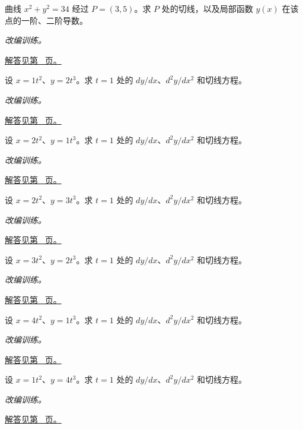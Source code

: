 \documentclass[UTF8,12pt,a4paper,fontset=fandol]{ctexart}
\begin{document}
\begin{example}[圆的隐函数导数]\label{ex:c9q6}
曲线 $x^2+y^2=34$ 经过 $P=(3,5)$。求 $P$ 处的切线，以及局部函数 $y(x)$ 在该点的一阶、二阶导数。
\par\textit{改编训练。}\par\hyperref[ans:c9q6]{解答见第~\pageref{ans:c9q6} 页。}
\end{example}
\begin{example}[幂参数曲线]\label{ex:c9q7}
设 $x=1t^2$、$y=2t^3$。求 $t=1$ 处的 $dy/dx$、$d^2y/dx^2$ 和切线方程。
\par\textit{改编训练。}\par\hyperref[ans:c9q7]{解答见第~\pageref{ans:c9q7} 页。}
\end{example}
\begin{example}[幂参数曲线]\label{ex:c9q8}
设 $x=2t^2$、$y=1t^3$。求 $t=1$ 处的 $dy/dx$、$d^2y/dx^2$ 和切线方程。
\par\textit{改编训练。}\par\hyperref[ans:c9q8]{解答见第~\pageref{ans:c9q8} 页。}
\end{example}
\begin{example}[幂参数曲线]\label{ex:c9q9}
设 $x=2t^2$、$y=3t^3$。求 $t=1$ 处的 $dy/dx$、$d^2y/dx^2$ 和切线方程。
\par\textit{改编训练。}\par\hyperref[ans:c9q9]{解答见第~\pageref{ans:c9q9} 页。}
\end{example}
\begin{example}[幂参数曲线]\label{ex:c9q10}
设 $x=3t^2$、$y=2t^3$。求 $t=1$ 处的 $dy/dx$、$d^2y/dx^2$ 和切线方程。
\par\textit{改编训练。}\par\hyperref[ans:c9q10]{解答见第~\pageref{ans:c9q10} 页。}
\end{example}
\begin{example}[幂参数曲线]\label{ex:c9q11}
设 $x=4t^2$、$y=1t^3$。求 $t=1$ 处的 $dy/dx$、$d^2y/dx^2$ 和切线方程。
\par\textit{改编训练。}\par\hyperref[ans:c9q11]{解答见第~\pageref{ans:c9q11} 页。}
\end{example}
\begin{example}[幂参数曲线]\label{ex:c9q12}
设 $x=1t^2$、$y=4t^3$。求 $t=1$ 处的 $dy/dx$、$d^2y/dx^2$ 和切线方程。
\par\textit{改编训练。}\par\hyperref[ans:c9q12]{解答见第~\pageref{ans:c9q12} 页。}
\end{example}
\end{document}
